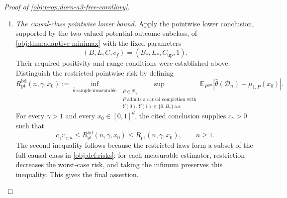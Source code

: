 \begin{proof}[Proof of \cref{obj:prop:dorn-a3-free-corollary}]
\begin{enumerate}
\item \emph{The causal-class pointwise lower bound.}
Apply the pointwise lower conclusion, supported by the two-valued potential-outcome subclass, of
\cref{obj:thm:adaptive-minimax} with the fixed parameters
\[
(B,L,C,c_f)=(B_*,L_*,C_{\mathrm{up}},1).
\]
Their required positivity and range conditions were established above. Distinguish the restricted pointwise risk by defining
\[
R_{\mathrm{pt}}^{\mathrm{bd}}(n,\gamma,x_0)
:=
\inf_{\widehat\theta\ \mathrm{sample\text{-}measurable}}
\sup_{\substack{P\in\mathcal P_\gamma\\
P\text{ admits a causal completion with}\\
Y(0),Y(1)\in\{0,B_*\}\ \text{a.s.}}}
\mathbb E_{P^{\otimes n}}
\left|\widehat\theta(\mathcal D_n)-\mu_{1,P}(x_0)\right|.
\]
For every \(\gamma>1\) and every \(x_0\in[0,1]^d\), the cited conclusion supplies \(c_\gamma>0\) such that
\[
c_\gamma r_{\gamma,n}
\le R_{\mathrm{pt}}^{\mathrm{bd}}(n,\gamma,x_0)
\le R_{\mathrm{pt}}(n,\gamma,x_0),
\qquad n\ge1.
\]
The second inequality follows because the restricted laws form a subset of the full causal class in \cref{obj:def:risks}: for each measurable estimator, restriction decreases the worst-case risk, and taking the infimum preserves this inequality. This gives the final assertion.
\end{enumerate}
\end{proof}

